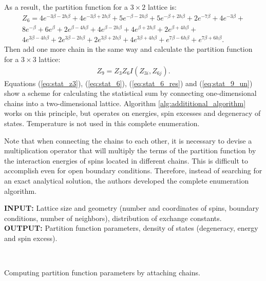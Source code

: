 \documentclass[preprint,12pt]{elsarticle}
\begin{document}
	As a result, the partition function for a $3 \times 2$ lattice is:
	\begin{equation}
		\label{eq:stat_6_res}
		\begin{alignedat}{3}
			Z_6 = 4 e^{ - 3 \beta-2 h\beta} + 4 e^{- 3 \beta+2 h\beta} + 5 e^{- \beta-2 h\beta } + 5 e^{- \beta+2 h\beta } + 2 e^{-7 \beta} + 4 e^{-3 \beta} + \\
			8 e^{-\beta} + 6 e^{\beta} + 2 e^{\beta-4 h\beta } + 4 e^{\beta-2 h\beta } + 4 e^{\beta+2 h\beta } + 2 e^{\beta+4 h\beta } + \\
			4 e^{3 \beta-4 h\beta } + 2 e^{3 \beta-2 h\beta } + 2 e^{3 \beta+2 h\beta } + 4 e^{3 \beta+4 h\beta } + e^{7 \beta-6 h\beta } + e^{7 \beta+6 h\beta }.
		\end{alignedat}
	\end{equation}
Then add one more chain in the same way and calculate the partition function for a $3 \times 3$ lattice:
\begin{equation}
	\label{eq:stat_9_un}
	\begin{alignedat}{2}
		Z_9 =  Z_{3}Z_{6}I(Z_{3i},Z_{6j}).
	\end{alignedat}
\end{equation}
Equations (\ref{eq:stat_z3}), (\ref{eq:stat_6}), (\ref{eq:stat_6_res}) and  (\ref{eq:stat_9_un}) show a scheme for calculating the statistical sum by connecting one-dimensional chains into a two-dimensional lattice. Algorithm \ref{alg:addititional_algorithm} \cite{trukhin2024glaurung} works on this principle, but operates on energies, spin excesses and degeneracy of states. Temperature is not used in this complete enumeration.
	
	Note that when connecting the chains to each other, it is necessary to devise a multiplication operator that will multiply the terms of the partition function by the interaction energies of spins located in different chains. This is difficult to accomplish even for open boundary conditions. Therefore, instead of searching for an exact analytical solution, the authors developed the complete enumeration algorithm.
	
	
	\begin{algorithm}[H]
		\textbf{INPUT:} Lattice size and geometry (number and coordinates of spins, boundary conditions, number of neighbors), distribution of exchange constants.\\
		\textbf{OUTPUT:} Partition function parameters, density of states (degeneracy, energy and spin excess).
		\begin{algorithmic}
			{
				{
				}
				\ENDFOR \\
			}
			\ENDFOR
		\end{algorithmic}
		\caption{Computing partition function parameters by attaching chains.}
		\label{alg:addititional_algorithm}
	\end{algorithm}
	
\end{document}
